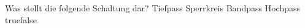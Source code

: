     {Was stellt die folgende Schaltung dar? }
    {Tiefpass}
    {Sperrkreis}
    {Bandpass}
    {Hochpass}
    {true}{false}